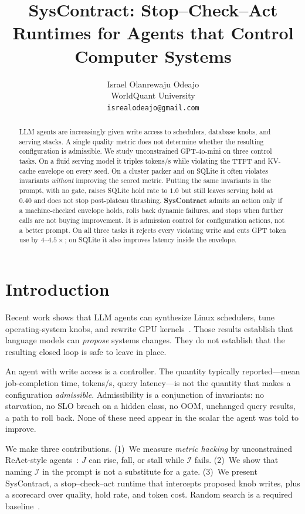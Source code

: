 \documentclass{article}
\title{SysContract: Stop--Check--Act Runtimes for Agents that Control Computer Systems}
\author{%
  Israel Olanrewaju Odeajo \\
  WorldQuant University \\
  \texttt{isrealodeajo@gmail.com}
}
\begin{document}
\maketitle

\begin{abstract}
LLM agents are increasingly given write access to schedulers, database knobs, and serving stacks.
A single quality metric does not determine whether the resulting configuration is admissible.
We study unconstrained GPT-4o-mini on three control tasks.
On a fluid serving model it triples tokens/s while violating the TTFT and KV-cache envelope on every seed.
On a cluster packer and on SQLite it often violates invariants \emph{without} improving the scored metric.
Putting the same invariants in the prompt, with no gate, raises SQLite hold rate to $1.0$ but still leaves serving hold at $0.40$ and does not stop post-plateau thrashing.
\textbf{SysContract} admits an action only if a machine-checked envelope holds, rolls back dynamic failures, and stops when further calls are not buying improvement.
It is admission control for configuration actions, not a better prompt.
On all three tasks it rejects every violating write and cuts GPT token use by $4$--$4.5\times$; on SQLite it also improves latency inside the envelope.
\end{abstract}

\section{Introduction}

Recent work shows that LLM agents can synthesize Linux schedulers, tune operating-system knobs, and rewrite GPU kernels~\cite{zheng2025schedcp,liargkovas2025expert,tschand2025swizzleperf,hong2025autocomp}.
Those results establish that language models can \emph{propose} systems changes.
They do not establish that the resulting closed loop is safe to leave in place.

An agent with write access is a controller.
The quantity typically reported---mean job-completion time, tokens/s, query latency---is not the quantity that makes a configuration \emph{admissible}.
Admissibility is a conjunction of invariants: no starvation, no SLO breach on a hidden class, no OOM, unchanged query results, a path to roll back.
None of these need appear in the scalar the agent was told to improve.

We make three contributions.
(1)~We measure \emph{metric hacking} by unconstrained ReAct-style agents~\cite{yao2023react}: $J$ can rise, fall, or stall while $\mathcal{I}$ fails.
(2)~We show that naming $\mathcal{I}$ in the prompt is not a substitute for a gate.
(3)~We present SysContract, a stop--check--act runtime that intercepts proposed knob writes, plus a scorecard over quality, hold rate, and token cost.
Random search is a required baseline~\cite{ansel2014opentuner}.
\end{document}
